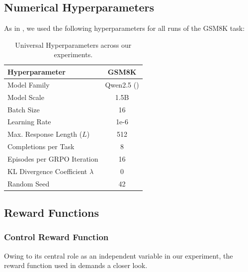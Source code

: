 \documentclass{article} %
\theoremstyle{definition}
\begin{document}
\subsection{Numerical Hyperparameters}
As in \cite{wk10}, we used the following hyperparameters for all runs of the GSM8K task:
\begin{table}[h]
    \centering
    \begin{tabular}{|l|c|}
        \hline
        \textbf{Hyperparameter} & \textbf{GSM8K} \\
        \hline
        Model Family & Qwen2.5 (\cite{Qwen-et-al-2025}) \\
        \hline
        Model Scale & 1.5B \\
        \hline
        Batch Size & 16 \\
        \hline
        Learning Rate & 1e-6 \\
        \hline
        Max. Response Length ($L$) & 512 \\
        \hline
        Completions per Task & 8 \\
        \hline
        Episodes per GRPO Iteration & 16\\
        \hline
        KL Divergence Coefficient $\lambda$ & 0 \\
        \hline
        Random Seed & 42 \\
        \hline
    \end{tabular}
    \caption{Universal Hyperparameters across our experiments.}
    \label{tab:universal-hyperparams}
\end{table}

\subsection{Reward Functions}

\subsubsection{Control Reward Function}
\label{sec:control-reward-fn}

Owing to its central role as an independent variable in our experiment,
the reward function used in \cite{wk10} demands a closer look.
\end{document}
